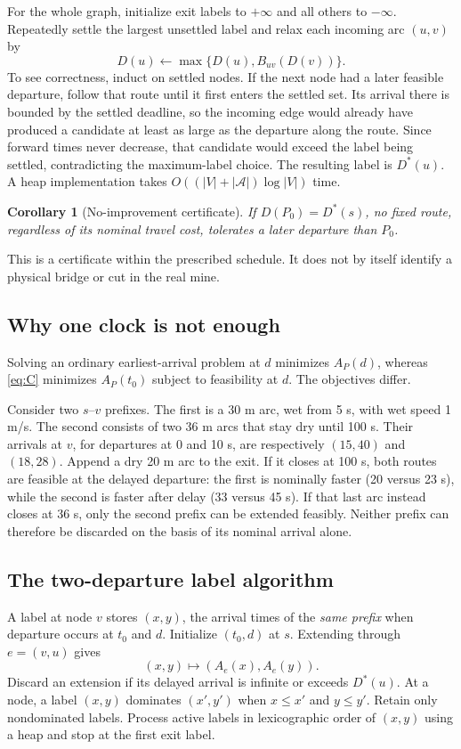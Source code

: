 \documentclass[11pt]{article}
\newtheorem{corollary}{Corollary}
\newcommand{\A}{\mathcal A}
\newcommand{\infv}{+\infty}
\begin{document}
For the whole graph, initialize exit labels to $\infv$ and all others to $-\infty$. Repeatedly settle the largest unsettled label and relax each incoming arc $(u,v)$ by
\[
 D(u)\leftarrow\max\{D(u),B_{uv}(D(v))\}.
\]
To see correctness, induct on settled nodes. If the next node had a later feasible departure, follow that route until it first enters the settled set. Its arrival there is bounded by the settled deadline, so the incoming edge would already have produced a candidate at least as large as the departure along the route. Since forward times never decrease, that candidate would exceed the label being settled, contradicting the maximum-label choice. The resulting label is $D^*(u)$. A heap implementation takes $O((|V|+|\A|)\log|V|)$ time.

\begin{corollary}[No-improvement certificate]
\label{cor:certificate}
If $D(P_0)=D^*(s)$, no fixed route, regardless of its nominal travel cost, tolerates a later departure than $P_0$.
\end{corollary}
This is a certificate within the prescribed schedule. It does not by itself identify a physical bridge or cut in the real mine.

\subsection{Why one clock is not enough}
Solving an ordinary earliest-arrival problem at $d$ minimizes $A_P(d)$, whereas \eqref{eq:C} minimizes $A_P(t_0)$ subject to feasibility at $d$. The objectives differ.

Consider two $s$--$v$ prefixes. The first is a 30 m arc, wet from 5 s, with wet speed 1 m/s. The second consists of two 36 m arcs that stay dry until 100 s. Their arrivals at $v$, for departures at 0 and 10 s, are respectively $(15,40)$ and $(18,28)$. Append a dry 20 m arc to the exit. If it closes at 100 s, both routes are feasible at the delayed departure: the first is nominally faster (20 versus 23 s), while the second is faster after delay (33 versus 45 s). If that last arc instead closes at 36 s, only the second prefix can be extended feasibly. Neither prefix can therefore be discarded on the basis of its nominal arrival alone.

\subsection{The two-departure label algorithm}
A label at node $v$ stores $(x,y)$, the arrival times of the \emph{same prefix} when departure occurs at $t_0$ and $d$. Initialize $(t_0,d)$ at $s$. Extending through $e=(v,u)$ gives
\begin{equation}
 (x,y)\longmapsto (A_e(x),A_e(y)).
 \label{eq:labels}
\end{equation}
Discard an extension if its delayed arrival is infinite or exceeds $D^*(u)$. At a node, a label $(x,y)$ dominates $(x',y')$ when $x\le x'$ and $y\le y'$. Retain only nondominated labels. Process active labels in lexicographic order of $(x,y)$ using a heap and stop at the first exit label.
\end{document}
